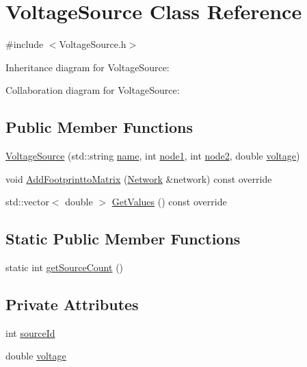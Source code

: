 \hypertarget{classVoltageSource}{}\section{Voltage\+Source Class Reference}
\label{classVoltageSource}


{\ttfamily \#include $<$Voltage\+Source.\+h$>$}



Inheritance diagram for Voltage\+Source\+:


Collaboration diagram for Voltage\+Source\+:
\subsection*{Public Member Functions}
\begin{DoxyCompactItemize}
\item 
\hyperlink{classVoltageSource_a0afb67483166d71942cefa624f484251}{Voltage\+Source} (std\+::string \hyperlink{classComponent_a46343549452bda5ee9752f7a9bc15efb}{name}, int \hyperlink{classComponent_a7d8cd23c0aaff5c139b825e77c0b2051}{node1}, int \hyperlink{classComponent_af96df64e1eb5fac7dae7c674cac3d31e}{node2}, double \hyperlink{classVoltageSource_a1bd00b28cadd7f5b0faa58fd33bceee9}{voltage})
\item 
void \hyperlink{classVoltageSource_a74f8a6a57480e9cff24414e106d2bbf1}{Add\+Footprintto\+Matrix} (\hyperlink{classNetwork}{Network} \&network) const override
\item 
std\+::vector$<$ double $>$ \hyperlink{classVoltageSource_a60bb1c5c07f668854a817d626f220f84}{Get\+Values} () const override
\end{DoxyCompactItemize}
\subsection*{Static Public Member Functions}
\begin{DoxyCompactItemize}
\item 
static int \hyperlink{classVoltageSource_a0b37bef66decef2d9d0268a1f732a78e}{get\+Source\+Count} ()
\end{DoxyCompactItemize}
\subsection*{Private Attributes}
\begin{DoxyCompactItemize}
\item 
int \hyperlink{classVoltageSource_a34411acea2cb7d017e1b5c0b826d69a6}{source\+Id}
\item 
double \hyperlink{classVoltageSource_a1bd00b28cadd7f5b0faa58fd33bceee9}{voltage}
\end{DoxyCompactItemize}
